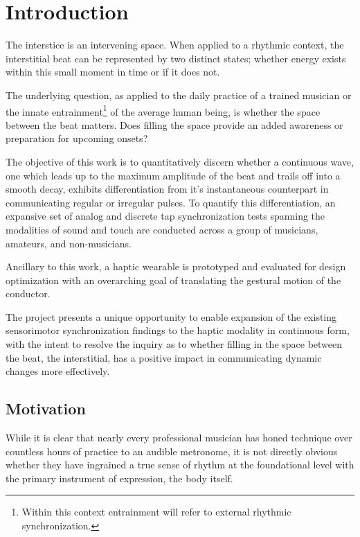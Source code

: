 
\chapter{Introduction} \label{secIntro}
The interstice is an intervening space. When applied to a rhythmic context, the interstitial beat can be represented by two distinct states; whether energy exists within this small moment in time or if it does not. 

The underlying question, as applied to the daily practice of a trained musician or the innate entrainment\footnote{Within this context entrainment will refer to external rhythmic synchronization.} of the average human being, is whether the space between the beat matters. Does filling the space provide an added awareness or preparation for upcoming onsets?

The objective of this work is to quantitatively discern whether a continuous wave, one which leads up to the maximum amplitude of the beat and trails off into a smooth decay, exhibits differentiation from it's instantaneous counterpart in communicating regular or irregular pulses. To quantify this differentiation, an expansive set of analog and discrete tap synchronization tests spanning the modalities of sound and touch are conducted across a group of musicians, amateurs, and non-musicians.

Ancillary to this work, a haptic wearable is prototyped and evaluated for design optimization with an overarching goal of translating the gestural motion of the conductor.

The project presents a unique opportunity to enable expansion of the existing sensorimotor synchronization findings to the haptic modality in continuous form, with the intent to resolve the inquiry as to whether filling in the space between the beat, the interstitial, has a positive impact in communicating dynamic changes more effectively.

\section{Motivation}
While it is clear that nearly every professional musician has honed technique over countless hours of practice to an audible metronome, it is not directly obvious whether they have ingrained a true sense of rhythm at the foundational level with the primary instrument of expression, the body itself.

